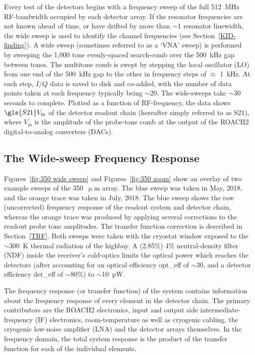 Every test of the detectors begins with a frequency sweep of the full 512~MHz RF-bandwidth occupied by each detector array. If the resonator frequencies are not known ahead of time, or have drifted by more than $\sim$1 resonator linewidth, the wide sweep is used to identify the channel frequencies (see Section~\ref{KID-finding}). A wide sweep (sometimes referred to as a `VNA' sweep) is performed by sweeping the 1,000 tone evenly-spaced search-comb over the 500~kHz gap between tones. The multitone comb is swept by stepping the local oscillator (LO) from one end of the 500~kHz gap to the other in frequency steps of $\approx$ 1~kHz. At each step, $I/Q$ data is saved to disk and co-added, with the number of data points taken at each frequency typically being $\sim$20. The wide-sweeps take $\sim$30 seconds to complete. Plotted as a function of RF-frequency, the data shows $\gls{S21}V_{\mathrm{in}}$ of the detector readout chain (hereafter simply referred to as \gls{S21}), where $V_{\mathrm{in}}$ is the amplitude of the probe-tone comb at the output of the ROACH2 digital-to-analog converters (DACs).

\subsection{The Wide-sweep Frequency Response}\label{freq response}

Figures~\ref{fig:350 wide sweep} and Figures~\ref{fig:350 zoom} show an overlay of two example sweeps of the 350~$\upmu$m array. The blue sweep was taken in May, 2018, and the orange trace was taken in July, 2018. The blue sweep shows the raw (uncorrected) frequency response of the readout system and detector chain, whereas the orange trace was produced by applying several corrections to the readout probe tone amplitudes. The transfer function correction is described in Section~\ref{TRF}. Both sweeps were taken with the cryostat window exposed to the $\sim$300~K thermal radiation of the highbay. A (2.85\%) 4\% neutral-density filter (NDF) inside the receiver's cold-optics limits the optical power which reaches the detectors (after accounting for an optical efficiency \gls{opt_eff} of $\sim$30, and a detector efficiency \gls{det_eff} of $\sim$80\%) to $\sim$10~pW.

The frequency response (or transfer function) of the system contains information about the frequency response of every element in the detector chain. The primary contributors are the ROACH2 electronics, input and output side intermediate-frequency (IF) electronics, room-temperature as well as cryogenic cabling, the cryogenic low-noise amplifier (LNA) and the detector arrays themselves. In the frequency domain, the total system response is the product of the transfer function for each of the individual elements.

